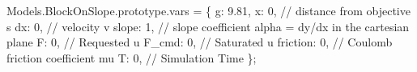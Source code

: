 \documentclass[
  8pt,
  a4paper,
]{book}
\newenvironment{Shaded}{\begin{snugshade}}{\end{snugshade}}
\newcommand{\AttributeTok}[1]{\textcolor[rgb]{0.40,0.45,0.13}{#1}}
\newcommand{\CommentTok}[1]{\textcolor[rgb]{0.37,0.37,0.37}{#1}}
\newcommand{\DataTypeTok}[1]{\textcolor[rgb]{0.68,0.00,0.00}{#1}}
\newcommand{\DecValTok}[1]{\textcolor[rgb]{0.68,0.00,0.00}{#1}}
\newcommand{\FloatTok}[1]{\textcolor[rgb]{0.68,0.00,0.00}{#1}}
\newcommand{\NormalTok}[1]{\textcolor[rgb]{0.00,0.23,0.31}{#1}}
\newcommand{\OperatorTok}[1]{\textcolor[rgb]{0.37,0.37,0.37}{#1}}
\newcommand*\circled[1]{\tikz[baseline=(char.base)]{
          \node[shape=circle,draw,inner sep=1pt] (char) {{\scriptsize#1}};}}
\begin{document}
\begin{codelisting}

\caption{\texttt{BlockOnSlope.js}}

\label{annotated-cell-3}%
\begin{Shaded}
\begin{Highlighting}[]
\NormalTok{Models}\OperatorTok{.}\AttributeTok{BlockOnSlope}\OperatorTok{.}\AttributeTok{prototype}\OperatorTok{.}\AttributeTok{vars} \OperatorTok{=} 
\NormalTok{\{ }\hspace*{\fill}\NormalTok{\circled{1}}
    \DataTypeTok{g}\OperatorTok{:} \FloatTok{9.81}\OperatorTok{,}
    \DataTypeTok{x}\OperatorTok{:} \DecValTok{0}\OperatorTok{,}          \CommentTok{// distance from objective s}
    \DataTypeTok{dx}\OperatorTok{:} \DecValTok{0}\OperatorTok{,}         \CommentTok{// velocity v}
    \DataTypeTok{slope}\OperatorTok{:} \DecValTok{1}\OperatorTok{,}      \CommentTok{// slope coefficient alpha = dy/dx in the cartesian plane}
    \DataTypeTok{F}\OperatorTok{:} \DecValTok{0}\OperatorTok{,}          \CommentTok{// Requested u}
    \DataTypeTok{F\_cmd}\OperatorTok{:} \DecValTok{0}\OperatorTok{,}      \CommentTok{// Saturated u}
    \DataTypeTok{friction}\OperatorTok{:} \DecValTok{0}\OperatorTok{,}   \CommentTok{// Coulomb friction coefficient mu}
    \DataTypeTok{T}\OperatorTok{:} \DecValTok{0}\OperatorTok{,}          \CommentTok{// Simulation Time}
\NormalTok{\}}\OperatorTok{;}


\end{Highlighting}
\end{Shaded}
\end{codelisting}
\end{document}
